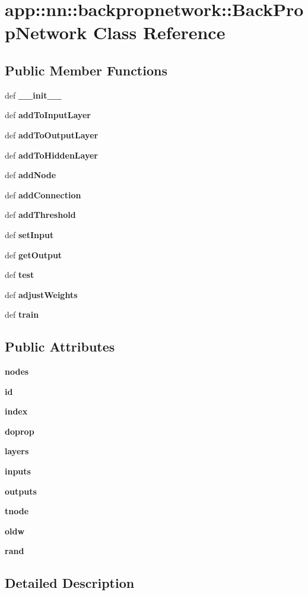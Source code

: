 \section{app::nn::backpropnetwork::BackPropNetwork Class Reference}
\label{classapp_1_1nn_1_1backpropnetwork_1_1BackPropNetwork}
\subsection*{Public Member Functions}
\begin{CompactItemize}
\item 
def {\bf \_\-\_\-init\_\-\_\-}
\item 
def {\bf addToInputLayer}
\item 
def {\bf addToOutputLayer}
\item 
def {\bf addToHiddenLayer}
\item 
def {\bf addNode}
\item 
def {\bf addConnection}
\item 
def {\bf addThreshold}
\item 
def {\bf setInput}
\item 
def {\bf getOutput}
\item 
def {\bf test}
\item 
def {\bf adjustWeights}
\item 
def {\bf train}
\end{CompactItemize}
\subsection*{Public Attributes}
\begin{CompactItemize}
\item 
{\bf nodes}
\item 
{\bf id}
\item 
{\bf index}
\item 
{\bf doprop}
\item 
{\bf layers}
\item 
{\bf inputs}
\item 
{\bf outputs}
\item 
{\bf tnode}
\item 
{\bf oldw}
\item 
{\bf rand}
\end{CompactItemize}


\subsection{Detailed Description}


